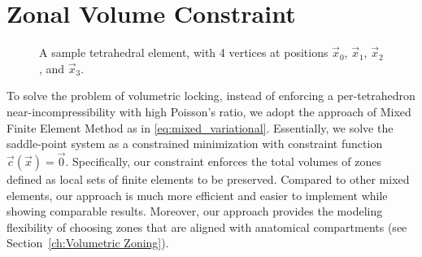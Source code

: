 \chapter{Zonal Volume Constraint}
\label{ch:Zonal Volume Constraint}

\begin{figure}[t]
	\centering
	\caption{A sample tetrahedral element, with 4 vertices at positions $\vec{x}_0$, $\vec{x}_1$, $\vec{x}_2$, and
		$\vec{x}_3$.}
	\label{fig:f2}
\end{figure}

To solve the problem of volumetric locking, instead of enforcing a per-tetrahedron
near-incompressibility with high Poisson's ratio, 
we adopt the approach of Mixed Finite Element Method as in \ref{eq:mixed_variational}. Essentially,
we solve the saddle-point system as a constrained minimization with constraint function
$\vec{c}(\vec{x}) = \vec{0}$. Specifically, our constraint enforces the total volumes of zones defined as
local sets of finite elements to be preserved.
Compared to other mixed elements, our approach is much more efficient and easier to implement while showing
comparable results. Moreover, our approach provides the modeling flexibility of choosing zones that 
are aligned with anatomical compartments (see Section~\ref{ch:Volumetric Zoning}).

